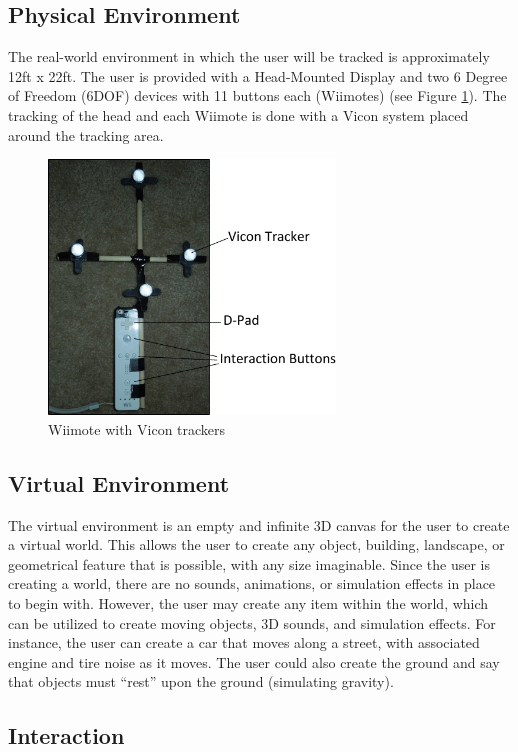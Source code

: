 \label{Design}
\subsection{Physical Environment}
\label{Design:PhysicalEnvironment}
The real-world environment in which the user will be tracked is approximately 12ft x 22ft.
The user is provided with a Head-Mounted Display and two 6 Degree of Freedom (6DOF) devices with 11 buttons each (Wiimotes) (see Figure \ref{fig:wiimote}).
The tracking of the head and each Wiimote is done with a Vicon system placed around the tracking area.

\begin{figure}[htbp]
	\centering
	\includegraphics[width=3in]{figs/wiimote.pdf}
	\caption{Wiimote with Vicon trackers}
	\label{fig:wiimote}
\end{figure}

\subsection{Virtual Environment}
\label{Design:VirtualEnvironment}
The virtual environment is an empty and infinite 3D canvas for the user to create a virtual world.
This allows the user to create any object, building, landscape, or geometrical feature that is possible, with any size imaginable.
Since the user is creating a world, there are no sounds, animations, or simulation effects in place to begin with.
However, the user may create any item within the world, which can be utilized to create moving objects, 3D sounds, and simulation effects.
For instance, the user can create a car that moves along a street, with associated engine and tire noise as it moves.
The user could also create the ground and say that objects must ``rest'' upon the ground (simulating gravity).

\subsection{Interaction}
\label{Design:Interaction}

